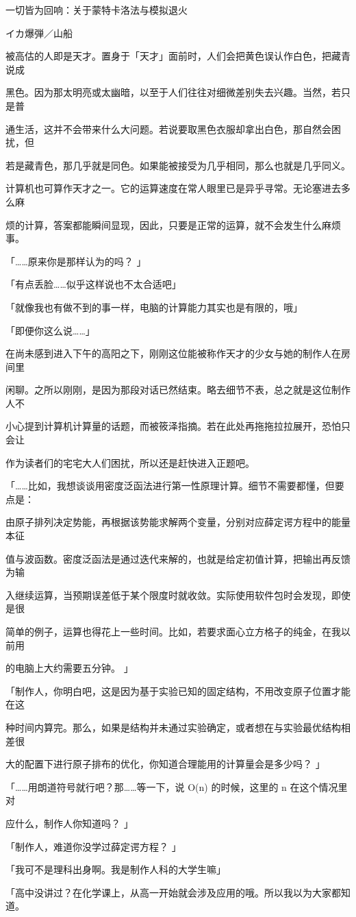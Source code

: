 一切皆为回响：关于蒙特卡洛法与模拟退火\par
イカ爆弾／山船\par
被高估的人即是天才。置身于「天才」面前时，人们会把黄色误认作白色，把藏青说成\par
黑色。因为那太明亮或太幽暗，以至于人们往往对细微差别失去兴趣。当然，若只是普\par
通生活，这并不会带来什么大问题。若说要取黑色衣服却拿出白色，那自然会困扰，但\par
若是藏青色，那几乎就是同色。如果能被接受为几乎相同，那么也就是几乎同义。\par
计算机也可算作天才之一。它的运算速度在常人眼里已是异乎寻常。无论塞进去多么麻\par
烦的计算，答案都能瞬间显现，因此，只要是正常的运算，就不会发生什么麻烦事。\par
「……原来你是那样认为的吗？ 」\par
「有点丢脸……似乎这样说也不太合适吧」\par
「就像我也有做不到的事一样，电脑的计算能力其实也是有限的，哦」\par
「即便你这么说……」\par
在尚未感到进入下午的高阳之下，刚刚这位能被称作天才的少女与她的制作人在房间里\par
闲聊。之所以刚刚，是因为那段对话已然结束。略去细节不表，总之就是这位制作人不\par
小心提到计算机计算量的话题，而被筱泽指摘。若在此处再拖拖拉拉展开，恐怕只会让\par
作为读者们的宅宅大人们困扰，所以还是赶快进入正题吧。\par
「……比如，我想谈谈用密度泛函法进行第一性原理计算。细节不需要都懂，但要点是：\par
由原子排列决定势能，再根据该势能求解两个变量，分别对应薛定谔方程中的能量本征\par
值与波函数。密度泛函法是通过迭代来解的，也就是给定初值计算，把输出再反馈为输\par
入继续运算，当预期误差低于某个限度时就收敛。实际使用软件包时会发现，即使是很\par
简单的例子，运算也得花上一些时间。比如，若要求面心立方格子的纯金，在我以前用\par
的电脑上大约需要五分钟。 」\par
「制作人，你明白吧，这是因为基于实验已知的固定结构，不用改变原子位置才能在这\par
种时间内算完。那么，如果是结构并未通过实验确定，或者想在与实验最优结构相差很\par
大的配置下进行原子排布的优化，你知道合理能用的计算量会是多少吗？ 」\par
「……用朗道符号就行吧？那……等一下，说 O(n) 的时候，这里的 n 在这个情况里对\par
应什么，制作人你知道吗？ 」\par
「制作人，难道你没学过薛定谔方程？ 」\par
「我可不是理科出身啊。我是制作人科的大学生嘛」\par
「高中没讲过？在化学课上，从高一开始就会涉及应用的哦。所以我以为大家都知道。\par

